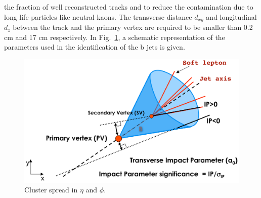 the fraction of well reconstructed tracks and to reduce the contamination due to long life particles like neutral kaons.
The transverse distance $d_{xy}$ and longitudinal $d_z$ between the track and the primary vertex
are required to be smaller than 0.2 cm and 17 cm respectively.
In Fig.~\ref{bj},  
a schematic representation of the parameters used in the identification 
of the b jets is given.
\begin{figure}
\centering
\includegraphics[scale= 0.5]{../Cap4/btag}
\caption{Cluster spread in $\eta$ and $\phi$.}
\label{bj}
\end{figure}
